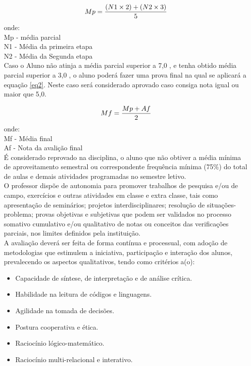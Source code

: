 \begin{equation}\label{eq1}
Mp=\dfrac{(N1 \times 2)+(N2 \times 3)}{5}\linebreak
\end{equation}
onde:\\
Mp - média parcial\\
N1 - Média da primeira etapa\\
N2 - Média da Segunda etapa\\

Caso o Aluno não atinja a média parcial superior a 7,0 , e tenha obtido média parcial superior a 3,0 , o aluno poderá fazer uma prova final na qual se aplicará a equação \eqref{eq2}. Neste caso será considerado aprovado caso consiga nota igual ou maior que 5,0.

\begin{equation}\label{eq2}
Mf=\dfrac{Mp + Af}{2}\\
\end{equation}  
onde:\\
Mf - Média final\\
Af - Nota da avalição final\\


É considerado reprovado na disciplina, o aluno que não obtiver a média mínima de aproveitamento semestral ou correspondente frequência mínima (75\%) do total de aulas e demais atividades programadas no semestre letivo.\\

O professor dispõe de autonomia para promover trabalhos de pesquisa e/ou de campo, exercícios e outras atividades em classe e extra classe, tais como apresentação de seminários; projetos interdisciplinares; resolução de situações- problema; provas objetivas e subjetivas que podem ser validados no processo somativo cumulativo e/ou qualitativo de notas ou conceitos das verificações parciais, nos limites definidos pela instituição.\\

A avaliação deverá ser feita de forma contínua e processual, com adoção de metodologias que estimulem a iniciativa, participação e interação dos alunos, prevalecendo os aspectos qualitativos, tendo como critérios a(o):

\begin{itemize}
\item Capacidade de síntese, de interpretação e de análise crítica.
\item Habilidade na leitura de códigos e linguagens.
\item Agilidade na tomada de decisões.
\item Postura cooperativa e ética.
\item Raciocínio lógico-matemático.
\item Raciocínio multi-relacional e interativo.
\end{itemize}

